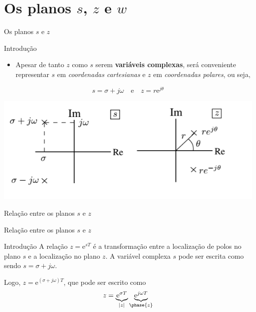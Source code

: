 \section{Os planos \texorpdfstring{$ s $, $ z $ e $ w $}{s, z e w}}

\begin{frame}{Os planos $s$ e $z$}
\begin{block}{Introdução}
\begin{itemize}
    \item Apesar de tanto $z$ como $s$ serem \textbf{variáveis  complexas}, será conveniente representar $s$ em \textit{coordenadas cartesianas} e $z$ em \textit{coordenadas polares}, ou seja, 
\end{itemize}
$$s = \sigma + j\omega \quad \text{e} \quad z = r\text{e}^{j\theta}$$
\end{block}
\centerline{\includegraphics[width=0.9\linewidth]{Figuras/Ch05/fig1.PNG}}
\end{frame}

\begin{frame}{Relação entre os planos $s$ e $z$}
\centering

\scalebox{0.7}{}
\end{frame}


\begin{frame}{Relação entre os planos $s$ e $z$}
\begin{block}{Introdução}
A relação $ z=\text{e}^{sT} $ é a transformação entre a localização de polos no plano $s $ e a localização no plano $ z $.
A variável complexa $ s $ pode ser escrita como sendo $ s=\sigma+j\omega $. 

\vspace{0.5cm}

Logo, $ z=\text{e}^{(\sigma+j\omega)T} $, que pode ser escrito como \[ z=\underbrace{\text{e}^{\sigma T}}_{|z|}\underbrace{\text{e}^{j\omega T}}_{\phase{z}} \]
\end{block}
\end{frame}


